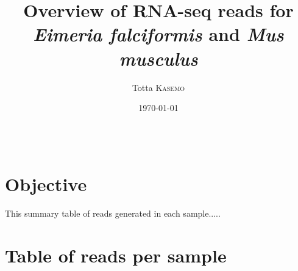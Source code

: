 \documentclass{article}
\title{Overview of RNA-seq reads for \textit{Eimeria falciformis} and \textit{Mus musculus}} %
\author{Totta \textsc{Kasemo}} %
\date{\today} %
\begin{document}
\maketitle %

\begin{center}
\begin{tabular}{l r}
\end{tabular}
\end{center}



\section{Objective}

This summary table of reads generated in each sample.....



\section{Table of reads per sample}
\end{document}
